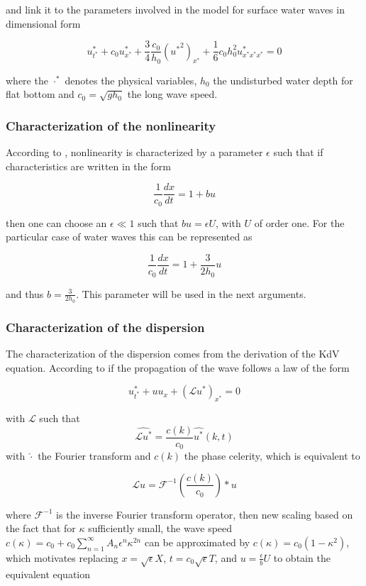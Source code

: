\noindent and link it to the parameters involved in the model for surface water waves  in dimensional form \cite{Khorsand2014}

\begin{equation}
    u^*_{t^*} + c_0u^*_{x^*} + \frac{3}{4}\frac{c_0}{h_0}({u^*}^2)_{x^*} + \frac{1}{6}c_0h_0^2u^*_{x^*x^*x^*} = 0 
\end{equation}

\noindent where the $\cdot^*$ denotes the physical variables, $h_0$ the undisturbed water depth for flat bottom and $c_0 = \sqrt{gh_0}$  the long wave speed.

\subsubsection{Characterization of the nonlinearity}

\indent According to \cite{BBM1971}, nonlinearity is characterized by a parameter $\epsilon$ such that if characteristics are written in the form

$$ \frac{1}{c_0} \frac{dx}{dt} = 1+ bu$$

\noindent then one can choose an $\epsilon \ll 1$ such that $bu=\epsilon U$, with $U$ of order one. For the particular case of water waves this can be represented as

$$ \frac{1}{c_0} \frac{dx}{dt} = 1 + \frac{3}{2h_0}u$$

\noindent and thus $b = \frac{3}{2h_0}$. This parameter will be used in the next arguments.

\subsubsection{Characterization of the dispersion}

\noindent The characterization of the dispersion comes from the derivation of the KdV equation. According to \cite{BBM1971} if the propagation of the wave follows a law of the form

$$ u^*_{t^*} + uu_x+(\mathcal{L} u^*)_{x^*} = 0$$

\indent with $\mathcal{L}$ such that $$ \hat{\mathcal{L}u^*} = \frac{c(k)}{c_0} \hat{u^*}(k,t)$$ with $\hat \cdot$ the Fourier transform and $c(k)$ the phase celerity, which is equivalent to 

$$ \mathcal{L} u = \mathcal{F}^{-1}\left(\frac{c(k)}{c_0}\right) * u$$ 

\noindent where $\mathcal{F}^{-1}$ is the inverse Fourier transform operator, then new scaling based on the fact that for $\kappa$ sufficiently small, the wave speed $c(\kappa) = c_0 + c_0 \sum_{n=1}^{\infty}A_n\epsilon^n\kappa^{2n}$ can be approximated by $c(\kappa) = c_0(1-\kappa^2)$, which motivates replacing $x=\sqrt{\epsilon} X$, $t =c_0 \sqrt{\epsilon} T$, and $u = \frac{\epsilon}{ b} U$ to obtain the equivalent equation 

